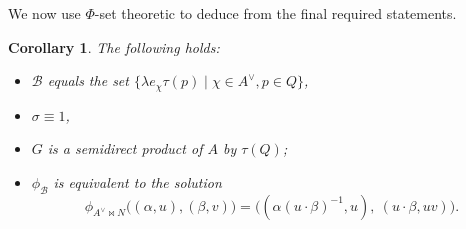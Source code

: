\documentclass[a4paper,10pt]{amsart}
\newtheorem{corollary}[lemma]{Corollary}
\theoremstyle{definition}
\theoremstyle{remark}
\newcommand\mc{\mathcal}
\begin{document}
We now use $\Phi$-set theoretic to deduce from  the final required statements.

\begin{corollary}
The following holds:
\begin{itemize}
    \item $\mc{B}$ equals the set $\{ \lambda e_{\chi} \tau(p) \mid \chi \in A^{\vee}, p \in Q \}$,
    \item $\sigma\equiv 1$,
    \item $G$ is a semidirect product of $A$ by $\tau(Q)$;
    \item $\phi_{\mc{B}}$ is equivalent to the solution
    $$\phi_{A^\vee\bowtie N}\bigl((\alpha,u),(\beta,v)\bigr)
=
\bigl((\alpha(u\cdot\beta)^{-1},u),\ (u\cdot\beta,uv)\bigr).$$
\end{itemize}
\end{corollary}
\end{document}

